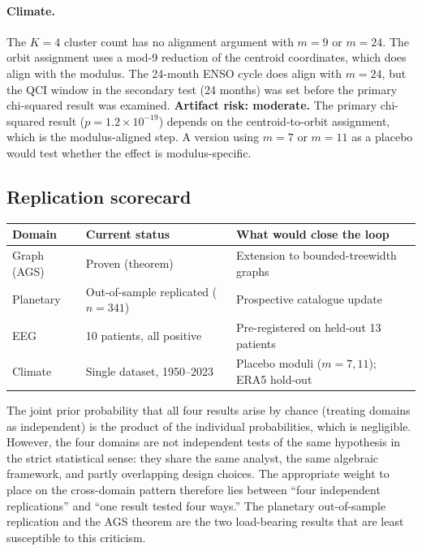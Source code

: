 \documentclass[11pt]{article}
\begin{document}
\paragraph{Climate.}
The $K=4$ cluster count has no alignment argument with $m=9$ or $m=24$.
The orbit assignment uses a mod-9 reduction of the centroid coordinates,
which does align with the modulus.
The 24-month ENSO cycle does align with $m=24$, but the QCI window in
the secondary test (24 months) was set before the primary chi-squared result
was examined.
\textbf{Artifact risk: moderate.}  The primary chi-squared result
($p=1.2\times10^{-19}$) depends on the centroid-to-orbit assignment,
which is the modulus-aligned step.  A version using $m=7$ or $m=11$
as a placebo would test whether the effect is modulus-specific.

\subsection{Replication scorecard}

\begin{center}
\small
\begin{tabular}{lll}
\toprule
\textbf{Domain} & \textbf{Current status} & \textbf{What would close the loop} \\
\midrule
Graph (AGS)          & Proven (theorem)       & Extension to bounded-treewidth graphs \\
Planetary            & Out-of-sample replicated ($n=341$) & Prospective catalogue update \\
EEG                  & 10 patients, all positive & Pre-registered on held-out 13 patients \\
Climate              & Single dataset, 1950--2023 & Placebo moduli ($m=7, 11$); ERA5 hold-out \\
\bottomrule
\end{tabular}
\end{center}

The joint prior probability that all four results arise by chance (treating
domains as independent) is the product of the individual probabilities,
which is negligible.  However, the four domains are not independent tests
of the same hypothesis in the strict statistical sense: they share the
same analyst, the same algebraic framework, and partly overlapping
design choices.  The appropriate weight to place on the cross-domain
pattern therefore lies between ``four independent replications''
and ``one result tested four ways.''
The planetary out-of-sample replication and the AGS theorem are the
two load-bearing results that are least susceptible to this criticism.
\end{document}
